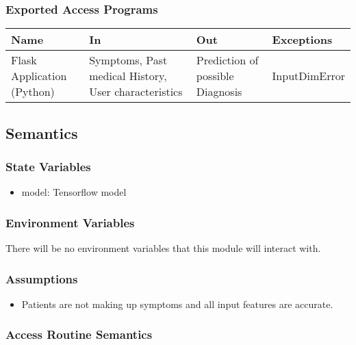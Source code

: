 \documentclass[12pt, titlepage]{article}
\begin{document}
\subsubsection{Exported Access Programs}

\begin{center}
\begin{tabular}{p{2cm} p{4cm} p{4cm} p{2cm}}
\hline
\textbf{Name} & \textbf{In} & \textbf{Out} & \textbf{Exceptions} \\
\hline
Flask Application (Python) & Symptoms, Past medical History, User characteristics & Prediction of possible Diagnosis & InputDimError \\
\hline
\end{tabular}
\end{center}

\subsection{Semantics}

\subsubsection{State Variables}

\begin{itemize}
  \item model: Tensorflow model
\end{itemize}

\subsubsection{Environment Variables}

There will be no environment variables that this module will interact with.

\subsubsection{Assumptions}

\begin{itemize}
  \item Patients are not making up symptoms and all input features are accurate.
\end{itemize}

\subsubsection{Access Routine Semantics}
\end{document}
